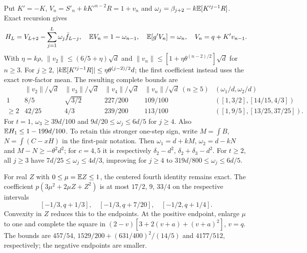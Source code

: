 Put $K'=-K$, $V_n=S'_n+kK'^{n-2}R=1+v_n$ and
$\omega_j=\beta_{j+2}-k\mathbb E[K'^{j-1}R]$.
Exact recursion gives
\[
 H_L=V_{L+2}-\sum_{j=1}^L\omega_j\bar f_{L-j},\quad
 \mathbb E V_n=1-\omega_{n-1},\quad\mathbb E[g'V_n]=\omega_n,
 \quad V_n=q+K'v_{n-1}.
\]
With $\eta=k\rho$,
$\|v_2\|\le(6/5+\eta)\sqrt d$ and
$\|v_n\|\le[1+\eta\theta^{(n-2)/2}]\sqrt d$ for $n\ge3$.
For $j\ge2$,
$|k\mathbb E[K'^{j-1}R]|\le\eta\theta^{(j-2)/2}d$;
the first coefficient instead uses the exact row-factor mean.
The resulting complete bounds are
\[
\begin{array}{c|ccccc}
 &\|v_2\|/\sqrt d&\|v_3\|/\sqrt d&\|v_4\|/\sqrt d&
 \|v_n\|/\sqrt d\ (n\ge5)&(\omega_1/d,\omega_2/d)\\\hline
1&8/5&\sqrt{3/2}&227/200&109/100&([1,3/2],[14/15,4/3])\\
\ge2&42/25&4/3&239/200&113/100&([1,9/5],[13/25,37/25]).
\end{array}
\]
For $t=1$, $\omega_3\ge39d/100$ and
$9d/20\le\omega_j\le6d/5$ for $j\ge4$.
Also $\mathbb E H_1\le1-199d/100$.
To retain this stronger one-step sign, write
$M=\int B$, $N=\int(C-xH)$ in the first-pair notation.
Then $\omega_1=d+kM$, $\omega_2=d-kN$ and
$M-N\ge-\theta^2d^2$; for $c=4,5$ it is respectively
$\delta_{2}-d^2$, $\delta_{2}+\delta_{3}-d^2$.
For $t\ge2$, all $j\ge3$ have
$7d/25\le\omega_j\le4d/3$, improving for $j\ge4$ to
$319d/800\le\omega_j\le6d/5$.

For real $Z$ with $0\le\mu=\mathbb E Z\le1$, the centered fourth identity
remains exact. The coefficient $p(3\mu^2+2\mu Z+Z^2)$ is at most
$17/2$, $9$, $33/4$ on the respective intervals
\[
 [-1/3,q+1/3],\quad[-1/3,q+7/20],\quad[-1/2,q+1/4].
\]
Convexity in $Z$ reduces this to the endpoints. At the positive endpoint,
enlarge $\mu$ to one and complete the square in
$(2-v)[3+2(v+a)+(v+a)^2]$, $v=q$.
The bounds are $457/54$, $1529/200+(631/400)^2/(14/5)$ and
$4177/512$, respectively; the negative endpoints are smaller.

